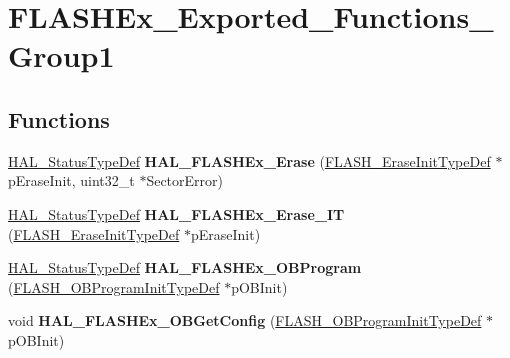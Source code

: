 \hypertarget{group___f_l_a_s_h_ex___exported___functions___group1}{}\section{F\+L\+A\+S\+H\+Ex\+\_\+\+Exported\+\_\+\+Functions\+\_\+\+Group1}
\label{group___f_l_a_s_h_ex___exported___functions___group1}
\subsection*{Functions}
\begin{DoxyCompactItemize}
\item 
\hyperlink{stm32f4xx__hal__def_8h_a63c0679d1cb8b8c684fbb0632743478f}{H\+A\+L\+\_\+\+Status\+Type\+Def} {\bfseries H\+A\+L\+\_\+\+F\+L\+A\+S\+H\+Ex\+\_\+\+Erase} (\hyperlink{struct_f_l_a_s_h___erase_init_type_def}{F\+L\+A\+S\+H\+\_\+\+Erase\+Init\+Type\+Def} $\ast$p\+Erase\+Init, uint32\+\_\+t $\ast$Sector\+Error)\hypertarget{group___f_l_a_s_h_ex___exported___functions___group1_ga3e998fdfd05d4073fb9af251ad649531}{}\label{group___f_l_a_s_h_ex___exported___functions___group1_ga3e998fdfd05d4073fb9af251ad649531}

\item 
\hyperlink{stm32f4xx__hal__def_8h_a63c0679d1cb8b8c684fbb0632743478f}{H\+A\+L\+\_\+\+Status\+Type\+Def} {\bfseries H\+A\+L\+\_\+\+F\+L\+A\+S\+H\+Ex\+\_\+\+Erase\+\_\+\+IT} (\hyperlink{struct_f_l_a_s_h___erase_init_type_def}{F\+L\+A\+S\+H\+\_\+\+Erase\+Init\+Type\+Def} $\ast$p\+Erase\+Init)\hypertarget{group___f_l_a_s_h_ex___exported___functions___group1_gaf58c6764859e4febc21abe462dfb2615}{}\label{group___f_l_a_s_h_ex___exported___functions___group1_gaf58c6764859e4febc21abe462dfb2615}

\item 
\hyperlink{stm32f4xx__hal__def_8h_a63c0679d1cb8b8c684fbb0632743478f}{H\+A\+L\+\_\+\+Status\+Type\+Def} {\bfseries H\+A\+L\+\_\+\+F\+L\+A\+S\+H\+Ex\+\_\+\+O\+B\+Program} (\hyperlink{struct_f_l_a_s_h___o_b_program_init_type_def}{F\+L\+A\+S\+H\+\_\+\+O\+B\+Program\+Init\+Type\+Def} $\ast$p\+O\+B\+Init)\hypertarget{group___f_l_a_s_h_ex___exported___functions___group1_ga001dd4a8defa9eb24a17c4df5953a41d}{}\label{group___f_l_a_s_h_ex___exported___functions___group1_ga001dd4a8defa9eb24a17c4df5953a41d}

\item 
void {\bfseries H\+A\+L\+\_\+\+F\+L\+A\+S\+H\+Ex\+\_\+\+O\+B\+Get\+Config} (\hyperlink{struct_f_l_a_s_h___o_b_program_init_type_def}{F\+L\+A\+S\+H\+\_\+\+O\+B\+Program\+Init\+Type\+Def} $\ast$p\+O\+B\+Init)\hypertarget{group___f_l_a_s_h_ex___exported___functions___group1_ga6d45d5442b8147533b1100ec40fe75d7}{}\label{group___f_l_a_s_h_ex___exported___functions___group1_ga6d45d5442b8147533b1100ec40fe75d7}


\end{DoxyCompactItemize}
